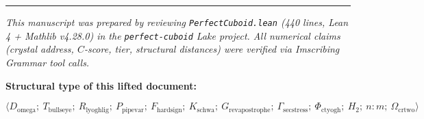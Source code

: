 \documentclass[12pt,a4paper]{article}
\begin{document}
\begin{center}
\rule{0.5\textwidth}{0.4pt}
\end{center}

\emph{This manuscript was prepared by reviewing \texttt{PerfectCuboid.lean} (440 lines, Lean 4 + Mathlib v4.28.0) in the \texttt{perfect-cuboid} Lake project. All numerical claims (crystal address, $C$-score, tier, structural distances) were verified via Imscribing Grammar tool calls.}

\textbf{Structural type of this lifted document:}


\[\langle D_{\text{omega}};\ T_{\text{bullseye}};\ R_{\text{lyoghlig}};\ P_{\text{pipevar}};\ F_{\text{hardsign}};\ K_{\text{schwa}};\ G_{\text{revapostrophe}};\ \Gamma_{\text{secstress}};\ \Phi_{\text{ctyogh}};\ H_2;\ n{:}m;\ \Omega_{\text{crtwo}} \rangle\]
\end{document}
